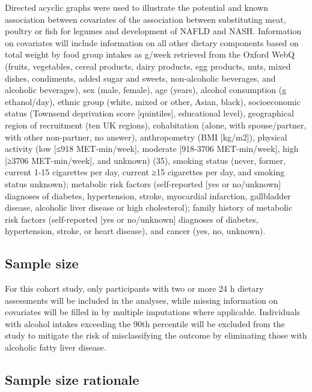 \documentclass[
  11pt,
  a4paper,
  DIV=11,
  numbers=noendperiod,
  twocolumn]{scrartcl}
\begin{document}
Directed acyclic graphs were used to illustrate the potential and known
association between covariates of the association between substituting
meat, poultry or fish for legumes and development of NAFLD and NASH.
Information on covariates will include information on all other dietary
components based on total weight by food group intakes as g/week
retrieved from the Oxford WebQ (fruits, vegetables, cereal products,
dairy products, egg products, nuts, mixed dishes, condiments, added
sugar and sweets, non-alcoholic beverages, and alcoholic beverages), sex
(male, female), age (years), alcohol consumption (g ethanol/day), ethnic
group (white, mixed or other, Asian, black), socioeconomic status
(Townsend deprivation score {[}quintiles{]}, educational level),
geographical region of recruitment (ten UK regions), cohabitation
(alone, with spouse/partner, with other non-partner, no answer),
anthropometry (BMI {[}kg/m2{]}), physical activity (low {[}≤918
MET-min/week{]}, moderate {[}918-3706 MET-min/week{]}, high {[}≥3706
MET-min/week{]}, and unknown) (35), smoking status (never, former,
current 1-15 cigarettes per day, current ≥15 cigarettes per day, and
smoking status unknown); metabolic risk factors (self-reported {[}yes or
no/unknown{]} diagnoses of diabetes, hypertension, stroke, myocardial
infarction, gallbladder disease, alcoholic liver disease or high
cholesterol); family history of metabolic risk factors (self-reported
{[}yes or no/unknown{]} diagnoses of diabetes, hypertension, stroke, or
heart disease), and cancer (yes, no, unknown).

\hypertarget{sample-size}{%
\subsection{Sample size}\label{sample-size}}

For this cohort study, only participants with two or more 24 h dietary
assessments will be included in the analyses, while missing information
on covariates will be filled in by multiple imputations where
applicable. Individuals with alcohol intakes exceeding the 90th
percentile will be excluded from the study to mitigate the risk of
misclassifying the outcome by eliminating those with alcoholic fatty
liver disease.

\hypertarget{sample-size-rationale}{%
\subsection{Sample size rationale}\label{sample-size-rationale}}
\end{document}
